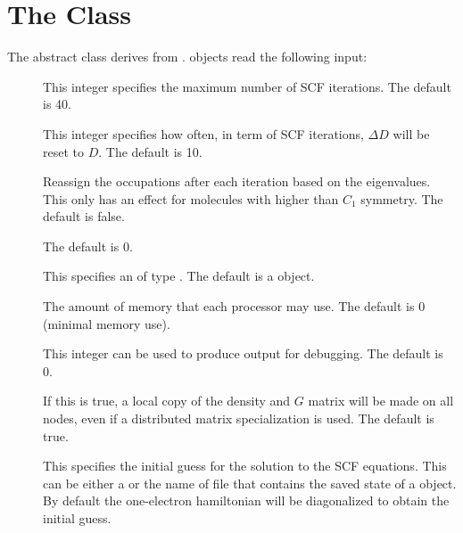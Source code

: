 

\section{The  Class}
\label{SCF}

The  abstract class derives from .
 objects read the following input:

\begin{description}
  \item[]  This integer specifies the maximum number of
     SCF iterations.  The default is 40.

  \item[] This integer specifies how
     often, in term of SCF iterations, $\Delta D$ will be reset to $D$.
     The default is 10.

  \item[] Reassign the occupations after each
     iteration based on the eigenvalues.  This only has an effect for
     molecules with higher than $C_1$ symmetry.  The default is false.

  \item[] The default is 0.

  \item[] This specifies an  of
     type .  The default is a
      object.

  \item[] The amount of memory that each processor may use.
     The default is 0 (minimal memory use).

  \item[] This integer can be used to produce output for
     debugging.  The default is 0.

  \item[] If this is true, a local copy of the
     density and $G$ matrix will be made on all nodes, even if a
     distributed matrix specialization is used.  The default is true.

  \item[] This specifies the initial guess for
     the solution to the SCF equations.  This can be either a
       or the name
     of file that contains the saved state of a
      object.  By default the one-electron
     hamiltonian will be diagonalized to obtain the initial guess.

\end{description}

